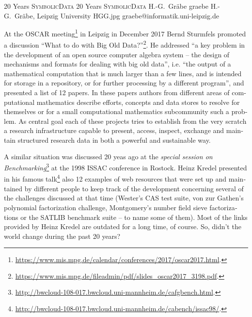 \documentclass[11pt]{article}
\def\SD{\textsc{SymbolicData}}
\begin{document}
\Aufsatz
{20 Years {\SD}}
{20 Years {\SD}}
{H.-G.\ Gr\"abe}
{graebe}
{H.-G.\ Gr\"abe, Leipzig University}
{HGG.jpg}
{graebe@informatik.uni-leipzig.de}

\begin{otherlanguage}{english}        
\vspace{3mm}
\begin{multicols}{2}
\noindent
  

At the OSCAR
meeting\footnote{\url{https://www.mis.mpg.de/calendar/conferences/2017/oscar2017.html}.}
in Leipzig in December 2017 Bernd Sturmfels promoted a discussion ``What to do
with Big Old
Data?''\footnote{\url{https://www.mis.mpg.de/fileadmin/pdf/slides_oscar2017_3198.pdf}.}.
He addressed ``a key problem in the development of an open source computer
algebra system -- the design of mechanisms and formats for dealing with big old
data'', i.e. ``the output of a mathematical computation that is much larger
than a few lines, and is intended for storage in a repository, or for further
processing by a different program'', and presented a list of 12 papers. In
these papers authors from different areas of computational mathematics describe
efforts, concepts and data stores to resolve for themselves or for a small
computational mathematics subcommunity such a problem.  As central goal each of
these projects tries to establish from the very scratch a research
infrastructure capable to present, access, inspect, exchange and maintain
structured research data in both a powerful and sustainable way.

A similar situation was discussed 20 yeas ago at the \emph{special session on
  Benchmarking}\footnote{\url{http://bwcloud-108-017.bwcloud.uni-mannheim.de/cafgbench.html}.}
at the 1998 ISSAC conference in Rostock.  Heinz Kredel presented in his famous
talk\footnote{\url{http://bwcloud-108-017.bwcloud.uni-mannheim.de/cabench/issac98/}.}
also 12 examples of web resources that were set up and maintained by different
people to keep track of the development concerning several of the challenges
discussed at that time (Wester's CAS test suite, von zur Gathen's polynomial
factorization challenge, Montgomery's number field sieve factorizations or the
SATLIB benchmark suite -- to name some of them). Most of the links provided by
Heinz Kredel are outdated for a long time, of course.  So, didn't the world
change during the past 20 years?


\end{multicols}
\end{otherlanguage}
\end{document}
